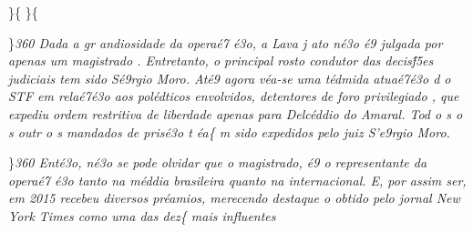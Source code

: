 \}\{\rtlch{}  \ltrch{} 
\tab \}\{\rtlch{}  \ltrch{} 
\par \}\pard \ltrpar\qj {}\sl360\widctlpar\wrapdefault\faauto{} {\rtlch{}  \ltrch{}  Dada a gr}{\rtlch{}  \ltrch{}  andiosidade da opera\'e7
\'e3o, a Lava}{\rtlch{}  \ltrch{}  j}{\rtlch{}  \ltrch{}  ato n\'e3o \'e9 }{\rtlch{}  \ltrch{}  julgada}{\rtlch{}  \ltrch{} 
  por apenas um }{\rtlch{}  \ltrch{}  magistrado}{\rtlch{}  \ltrch{}  . Entretanto, o principal rosto }{\rtlch{}  \ltrch{}  
condutor}{\rtlch{}  \ltrch{}   das decis\'f5es judiciais tem sido S\'e9rgio Moro. At\'e9 agora }{\rtlch{}  \ltrch{}  v\'ea-se uma t\'edmida atua\'e7\'e3o d}{\rtlch{}  \ltrch{} 
 o STF}{\rtlch{}  \ltrch{}   em rela\'e7\'e3o aos pol\'edticos envolvidos, detentores de foro privilegiado}{\rtlch{}  \ltrch{}  
, que expediu ordem restritiva de liberdade apenas para Delc\'eddio do Amaral. Tod}{\rtlch{}  \ltrch{}  o}{\rtlch{}  \ltrch{}  s }{\rtlch{}  \ltrch{}  o}{\rtlch{}  
\ltrch{}  s outr}{\rtlch{}  \ltrch{}  o}{\rtlch{}  \ltrch{}  s }{\rtlch{}  \ltrch{}  mandados de pris\'e3o t}{\rtlch{}  \ltrch{} 
 \'ea}\{\rtlch{}  \ltrch{}
 m sido expedidos pelo juiz S'e9rgio
Moro.
\par \}\pard \ltrpar\qj {}\sl360\widctlpar\wrapdefault\faauto{} {\rtlch{}  \ltrch{}  \tab Ent\'e3o, n\'e3o se pode olvidar que o magistrado, \'e9 o representante da opera\'e7
\'e3o tanto na m\'eddia brasileira quanto na internacional. E, por assim ser, em 2015 recebeu diversos pr\'eamios, merecendo destaque o obtido pelo jornal New York Times como uma das }{\rtlch{}  \ltrch{}  dez}\{\rtlch{}
 \ltrch{}  mais influentes
